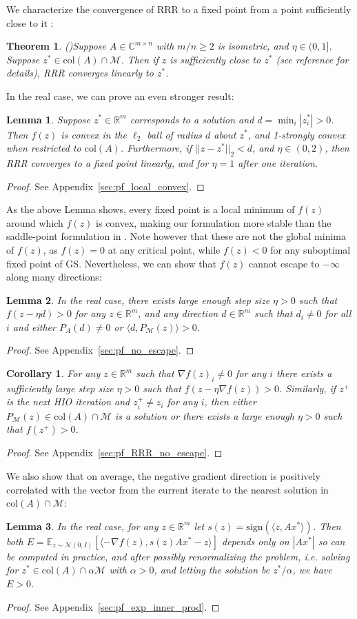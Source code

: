 \documentclass[journal]{IEEEtran}
\newtheorem{theorem}{Theorem}
\newtheorem{lemma}{Lemma}
\newtheorem{corollary}{Corollary}
\theoremstyle{definition}
\theoremstyle{remark}
\theoremstyle{definition}
\theoremstyle{problem}
\theoremstyle{definition}
\newcommand{\bthm}{\begin{theorem}}
\newcommand{\ethm}{\end{theorem}}
\newcommand{\blem}{\begin{lemma}}
\newcommand{\elem}{\end{lemma}}
\newcommand{\bpof}{\begin{proof}}
\newcommand{\epof}{\end{proof}}
\newcommand{\bcor}{\begin{corollary}}
\newcommand{\ecor}{\end{corollary}}
\newcommand{\col}{\text{col}}
\newcommand{\sign}{\text{sign}}
\newcommand{\RR}{\mathbb{R} }
\newcommand{\CC}{\mathbb{C}}
\newcommand{\MM}{\mathcal{M}}
\newcommand{\EE}{\mathbb{E}}
\newcommand{\TODO}[1]{{\color{red}{[#1]}}}
\begin{document}
We characterize the convergence of RRR to a fixed point from a point sufficiently close to it \TODO{in its basin of attraction?}:
\bthm\emph{(\cite[Thm. 3]{Li2017a})}\label{lem:lin_conver} Suppose $A\in\CC^{m\times n}$ with $m/n\geq 2$ is isometric, and $\eta\in(0,1]$. Suppose $z^*\in\col(A)\cap\MM$. Then if $z$ is sufficiently close to $z^*$ (see reference for details), RRR converges linearly to $z^*$. \ethm

In the real case, we can prove an even stronger result:
\blem\label{lem:local_convex} Suppose $z^*\in\RR^m$ corresponds to a solution and $d = \min_i|z^*_i| > 0$. Then $f(z)$ is convex in the $\ell_2$ ball of radius $d$ about $z^*$, and 1-strongly convex when restricted to $\col(A)$. Furthermore, if $||z-z^*||_2<d$, and $\eta\in(0,2)$, then RRR converges to a fixed point linearly, and for $\eta=1$ after one iteration. \elem
\bpof See Appendix~\ref{sec:pf_local_convex}. \epof

As the above Lemma shows, every fixed point is a local minimum of $f(z)$ around which $f(z)$ is convex, making our formulation more stable than the saddle-point formulation in \cite{Marchesini2007}. Note however that these are not the global minima of $f(z)$, as $f(z)=0$ at any critical point, while $f(z)<0$ for any suboptimal fixed point of GS. Nevertheless, we can show that $f(z)$ cannot escape to $-\infty$ along many directions:

\blem\label{lem:no_escape} In the real case, there exists large enough step size $\eta>0$ such that $f(z-\eta d) > 0$ for any $z\in\RR^m$, and any direction $d\in\RR^m$ such that $d_i\neq 0$ for all $i$ and either $P_A(d)\neq 0$ or $\langle d, P_{\MM}(z)\rangle > 0$. \elem
\bpof See Appendix~\ref{sec:pf_no_escape}. \epof

\bcor\label{cor:RRR_no_escape} For any $z\in\RR^m$ such that $\nabla f(z)_i\neq 0$ for any $i$ there exists a sufficiently large step size $\eta>0$ such that $f(z-\eta\nabla f(z)) > 0$. Similarly, if $z^+$ is the next HIO iteration and $z^+_i\neq z_i$ for any $i$, then either $P_{\MM}(z)\in\col(A)\cap\MM$ is a solution or there exists a large enough $\eta>0$ such that $f(z^+)>0$. \ecor
\bpof See Appendix~\ref{sec:pf_RRR_no_escape}. \epof

We also show that on average, the negative gradient direction is positively correlated with the vector from the current iterate to the nearest solution in $\col(A)\cap\MM$:
\blem\label{lem:exp_inner_prod} In the real case, for any $z\in\RR^m$ let $s(z) = \sign\left(\langle z, Ax^*\rangle\right)$. Then both $E = \EE_{z\sim\mathcal{N}(0, I)}\left[\langle -\nabla f(z), s(z)Ax^*-z\rangle\right]$ depends only on $|Ax^*|$ so can be computed in practice, and after possibly renormalizing the problem, i.e. solving for $z^*\in\col(A)\cap\alpha\MM$ with $\alpha>0$, and letting the solution be $z^*/\alpha$, we have $E>0$. \elem
\bpof See Appendix~\ref{sec:pf_exp_inner_prod}. \epof
\end{document}

